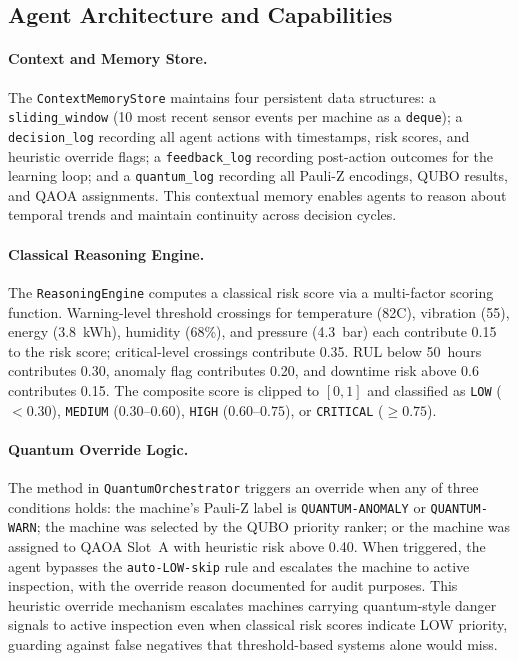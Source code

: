 \subsection{Agent Architecture and Capabilities}

\paragraph{Context and Memory Store.} The \texttt{ContextMemoryStore} maintains four persistent data structures: a \texttt{sliding\_window} (10 most recent sensor events per machine as a \texttt{deque}); a \texttt{decision\_log} recording all agent actions with timestamps, risk scores, and heuristic override flags; a \texttt{feedback\_log} recording post-action outcomes for the learning loop; and a \texttt{quantum\_log} recording all Pauli-Z encodings, QUBO results, and QAOA assignments. This contextual memory enables agents to reason about temporal trends and maintain continuity across decision cycles.

\paragraph{Classical Reasoning Engine.} The \texttt{ReasoningEngine} computes a classical risk score via a multi-factor scoring function. Warning-level threshold crossings for temperature (82\textdegree C), vibration (55), energy (3.8~kWh), humidity (68\%), and pressure (4.3~bar) each contribute 0.15 to the risk score; critical-level crossings contribute 0.35. RUL below 50~hours contributes 0.30, anomaly flag contributes 0.20, and downtime risk above 0.6 contributes 0.15. The composite score is clipped to $[0,1]$ and classified as \texttt{LOW} ($< 0.30$), \texttt{MEDIUM} ($0.30$--$0.60$), \texttt{HIGH} ($0.60$--$0.75$), or \texttt{CRITICAL} ($\geq 0.75$).

\paragraph{Quantum Override Logic.} The method in \texttt{QuantumOrchestrator} triggers an override when any of three conditions holds: the machine's Pauli-Z label is \texttt{QUANTUM-ANOMALY} or \texttt{QUANTUM-WARN}; the machine was selected by the QUBO priority ranker; or the machine was assigned to QAOA Slot~A with heuristic risk above 0.40. When triggered, the agent bypasses the \texttt{auto-LOW-skip} rule and escalates the machine to active inspection, with the override reason documented for audit purposes. This heuristic override mechanism escalates machines carrying quantum-style danger signals to active inspection even when classical risk scores indicate LOW priority, guarding against false negatives that threshold-based systems alone would miss.

